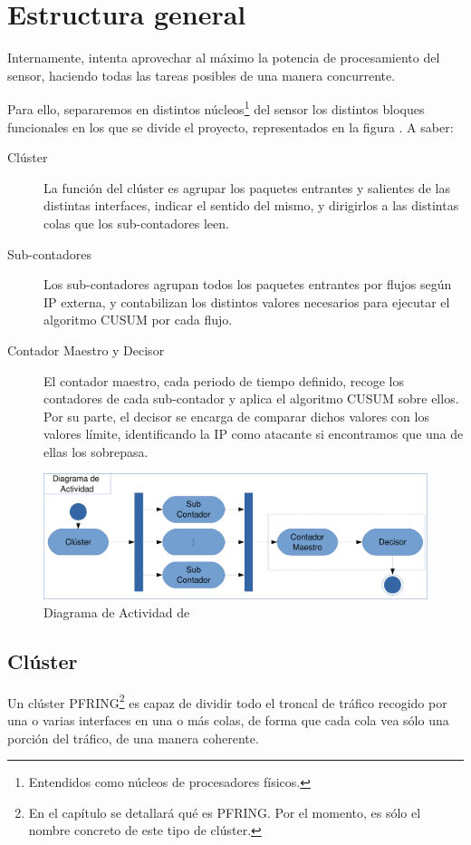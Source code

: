 \section{Estructura general}
Internamente, \redborderddos{} intenta aprovechar al máximo la potencia de procesamiento del sensor, haciendo todas las 
tareas posibles de una manera concurrente.

Para ello, separaremos en distintos núcleos\footnote{Entendidos como núcleos de procesadores físicos.} del sensor los 
distintos bloques funcionales en los que se divide el proyecto, representados en la figura . A 
saber:

\begin{description}
 \item [Clúster] La función del clúster es agrupar los paquetes entrantes y salientes de las distintas 
interfaces, indicar el sentido del mismo, y dirigirlos a las distintas colas que los sub-contadores leen.
 \item [Sub-contadores] Los sub-contadores agrupan todos los paquetes entrantes por flujos según IP externa, y 
contabilizan los distintos valores necesarios para ejecutar el algoritmo \gls{CUSUM} por cada flujo.
 \item [Contador Maestro y Decisor] El contador maestro, cada periodo de tiempo definido, recoge los contadores de cada 
sub-contador y aplica el algoritmo \gls{CUSUM} sobre ellos. Por su parte, el decisor se encarga de comparar dichos 
valores con los valores límite, identificando la IP como atacante si encontramos que una de ellas los sobrepasa.
\end{description}

\begin{figure}[htbp]
\centering
\includegraphics[width=\textwidth]{CapituloEstructura/Figuras/DiagramaFlow-crop}
\caption{Diagrama de Actividad de \redborderddos}
\end{figure}
%

\subsection{Clúster}
Un clúster \acrshort{PFRING}\footnote{En el capítulo  se detallará qué es \acrshort{PFRING}. Por el 
momento, es sólo el nombre concreto de este tipo de clúster.} es capaz de dividir todo el troncal de tráfico recogido 
por una o varias interfaces en una o más colas, de forma que cada cola vea sólo una porción del tráfico, de una manera 
coherente.


